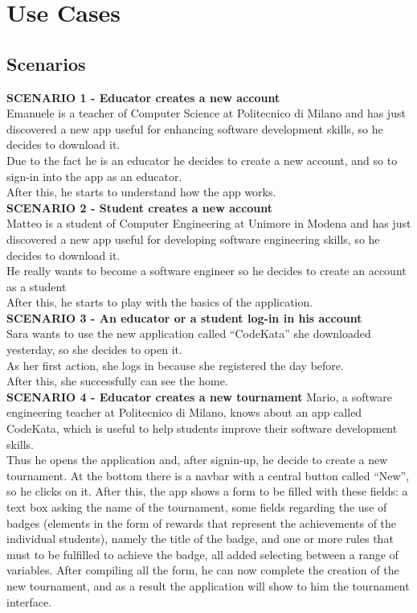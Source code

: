 \section{Use Cases}
    \subsection{Scenarios}
    \textbf{SCENARIO 1 - Educator creates a new account} \\
    Emanuele is a teacher of Computer Science at Politecnico di Milano and has just discovered a new app useful for enhancing software development skills, so he decides to download it. \\
    Due to the fact he is an educator he decides to create a new account, and so to sign-in into the app as an educator. \\
    After this, he starts to understand how the app works.\\
    
    \textbf{SCENARIO 2 - Student creates a new account} \\
    Matteo is a student of Computer Engineering at Unimore in Modena and has just discovered a new app useful for developing software engineering skills, so he decides to download it. \\
    He really wants to become a software engineer so he decides to create an account as a student \\
    After this, he starts to play with the basics of the application.\\

    \textbf{SCENARIO 3 - An educator or a student log-in in his account} \\
    Sara wants to use the new application called ``CodeKata'' she downloaded yesterday, so she decides to open it. \\
    As her first action, she logs in because she registered the day before. \\
    After this, she successfully can see the home.\\

    
    \textbf{SCENARIO 4 - Educator creates a new tournament}
    Mario, a software engineering teacher at Politecnico di Milano, knows about an app called CodeKata, which is useful to help students improve their software development skills. \\
    Thus he opens the application and, after signin-up, he decide to create a new tournament. 
    At the bottom there is a navbar with a central button called  ``New'', so he clicks on it. After this, the app shows a form to be filled with these fields: a text box asking the name of the tournament, some fields regarding the use of badges (elements in the form of rewards that represent the achievements of the individual students), namely the title of the badge, and one or more rules that must to be fulfilled to achieve the badge, all added selecting between a range of variables. 
    After compiling all the form, he can now complete the creation of the new tournament, and as a result the application will show to him the tournament interface.\\



